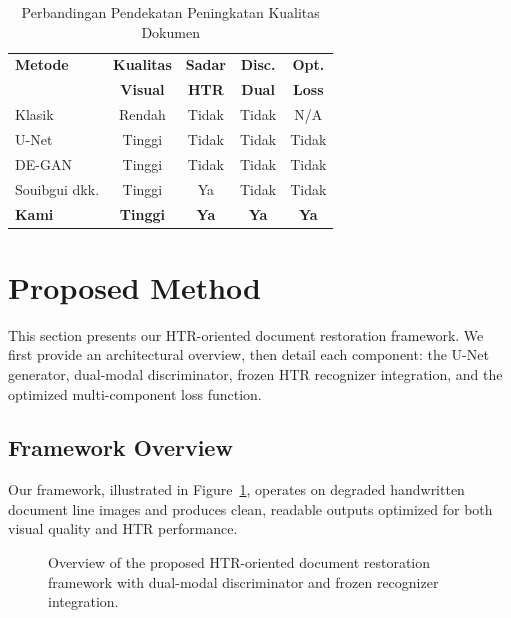 \documentclass[journal]{IEEEtran}
\begin{document}
\begin{table}[!t]
\renewcommand{\arraystretch}{1.3}
\caption{Perbandingan Pendekatan Peningkatan Kualitas Dokumen}
\label{table_comparison}
\centering
\begin{tabular}{|l|c|c|c|c|}
\hline
\textbf{Metode} & \textbf{Kualitas} & \textbf{Sadar} & \textbf{Disc.} & \textbf{Opt.} \\
 & \textbf{Visual} & \textbf{HTR} & \textbf{Dual} & \textbf{Loss} \\
\hline
Klasik & Rendah & Tidak & Tidak & N/A \\
U-Net & Tinggi & Tidak & Tidak & Tidak \\
DE-GAN & Tinggi & Tidak & Tidak & Tidak \\
Souibgui dkk. & Tinggi & Ya & Tidak & Tidak \\
\textbf{Kami} & \textbf{Tinggi} & \textbf{Ya} & \textbf{Ya} & \textbf{Ya} \\
\hline
\end{tabular}
\end{table}

\section{Proposed Method}

This section presents our HTR-oriented document restoration framework. We first provide an architectural overview, then detail each component: the U-Net generator, dual-modal discriminator, frozen HTR recognizer integration, and the optimized multi-component loss function.

\subsection{Framework Overview}

Our framework, illustrated in Figure~\ref{fig:architecture_overview}, operates on degraded handwritten document line images and produces clean, readable outputs optimized for both visual quality and HTR performance.

\begin{figure}[!t]
\centering
\caption{Overview of the proposed HTR-oriented document restoration framework with dual-modal discriminator and frozen recognizer integration.}
\label{fig:architecture_overview}
\end{figure}
\end{document}
